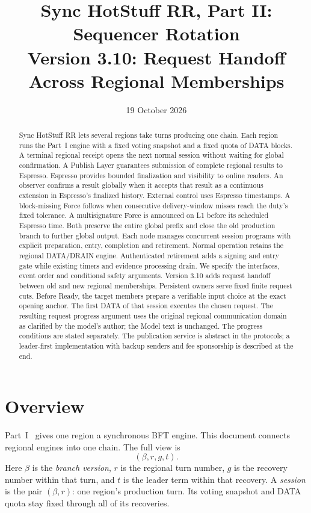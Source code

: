 \documentclass[11pt,a4paper]{article}
\title{Sync HotStuff RR, Part II: Sequencer Rotation\\\large Version 3.10: Request Handoff Across Regional Memberships}
\author{}\date{19 October 2026}
\newcommand{\defterm}[1]{\textcolor{rrBlue}{\textit{#1}}}
\newcounter{protocol}
\begin{document}
\maketitle
\begin{abstract}
Sync HotStuff RR lets several regions take turns producing one chain.
Each region runs the Part~I engine with a fixed voting snapshot and a
fixed quota of DATA blocks. A terminal regional receipt opens the next
normal session without waiting for global confirmation. A Publish Layer
guarantees submission of complete regional results to Espresso. Espresso
provides bounded finalization and visibility to online readers. An observer confirms a result
globally when it accepts that result as a continuous extension in
Espresso's finalized history. External control uses Espresso timestamps.
A block-missing Force follows when consecutive delivery-window misses
reach the duty's fixed tolerance. A multisignature Force is announced on L1 before its scheduled
Espresso time. Both preserve the entire global prefix and close the old
production branch to further global output. Each node manages concurrent session programs with explicit preparation,
entry, completion and retirement. Normal operation retains the regional
DATA/DRAIN engine. Authenticated retirement adds a signing and entry gate
while existing timers and evidence processing drain. We specify the
interfaces, event order and conditional safety arguments. Version 3.10
adds request handoff between old and new regional memberships. Persistent
owners serve fixed finite request cuts. Before Ready, the target members
prepare a verifiable input choice at the exact opening anchor. The first
DATA of that session executes the chosen request. The resulting request
progress argument uses the original regional communication domain as
clarified by the model's author; the Model text is unchanged.
The progress conditions are stated separately. The publication service is
abstract in the protocols; a leader-first implementation with backup
senders and fee sponsorship is described at the end.
\end{abstract}

\section{Overview}
\label{sec:overview}
Part~I~\cite{part1} gives one region a synchronous BFT engine.
This document connects regional engines into one chain. The full view is
\[
 (\beta,r,g,t).
\]
Here $\beta$ is the \defterm{branch version}, $r$ is the regional turn
number, $g$ is the recovery number within that turn, and $t$ is the
leader term within that recovery. A \defterm{session} is the pair
$(\beta,r)$: one region's production turn. Its voting snapshot and DATA
quota stay fixed through all of its recoveries.
\end{document}
